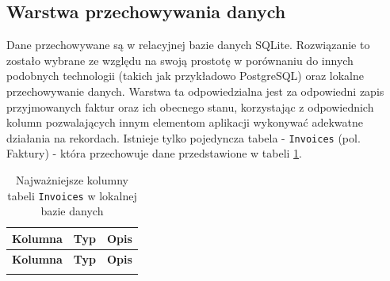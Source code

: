 \subsection{Warstwa przechowywania danych}
Dane przechowywane są w relacyjnej bazie danych SQLite. Rozwiązanie to zostało wybrane ze względu na swoją prostotę w porównaniu do innych podobnych technologii (takich jak przykładowo PostgreSQL) oraz lokalne przechowywanie danych. Warstwa ta odpowiedzialna jest za odpowiedni zapis przyjmowanych faktur oraz ich obecnego stanu, korzystając z odpowiednich kolumn pozwalających innym elementom aplikacji wykonywać adekwatne działania na rekordach. Istnieje tylko pojedyncza tabela - \texttt{Invoices} (pol. Faktury) - która przechowuje dane przedstawione w tabeli \ref{tab:sqlite_invoices}. 

\begin{small}
\begin{longtable}{>{\raggedright\arraybackslash}p{4cm} >{\raggedright\arraybackslash}p{2cm} >{\raggedright\arraybackslash}p{7cm}}
    \caption{Najważniejsze kolumny tabeli \texttt{Invoices} w lokalnej bazie danych}
\label{tab:sqlite_invoices} \\
\toprule
\textbf{Kolumna} & \textbf{Typ} & \textbf{Opis} \\
\midrule
\endfirsthead

\toprule
\textbf{Kolumna} & \textbf{Typ} & \textbf{Opis} \\
\midrule
\endhead

\bottomrule
\endfoot


\end{longtable}
\end{small}
